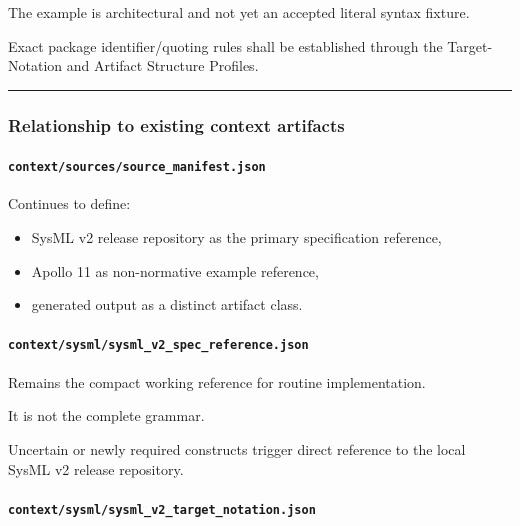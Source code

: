 The example is architectural and not yet an accepted literal syntax fixture.

Exact package identifier/quoting rules shall be established through the Target-Notation and Artifact Structure Profiles.

\begin{center}\rule{0.5\linewidth}{0.5pt}\end{center}

\hypertarget{relationship-to-existing-context-artifacts}{%
\subsubsection{Relationship to existing context artifacts}\label{relationship-to-existing-context-artifacts}}

\hypertarget{contextsourcessource_manifestjson}{%
\paragraph{\texorpdfstring{\texttt{context/sources/source\_manifest.json}}{context/sources/source\_manifest.json}}\label{contextsourcessource_manifestjson}}

Continues to define:

\begin{itemize}
\tightlist
\item
  SysML v2 release repository as the primary specification reference,
\item
  Apollo 11 as non-normative example reference,
\item
  generated output as a distinct artifact class.
\end{itemize}

\hypertarget{contextsysmlsysml_v2_spec_referencejson}{%
\paragraph{\texorpdfstring{\texttt{context/sysml/sysml\_v2\_spec\_reference.json}}{context/sysml/sysml\_v2\_spec\_reference.json}}\label{contextsysmlsysml_v2_spec_referencejson}}

Remains the compact working reference for routine implementation.

It is not the complete grammar.

Uncertain or newly required constructs trigger direct reference to the local SysML v2 release repository.

\hypertarget{contextsysmlsysml_v2_target_notationjson}{%
\paragraph{\texorpdfstring{\texttt{context/sysml/sysml\_v2\_target\_notation.json}}{context/sysml/sysml\_v2\_target\_notation.json}}\label{contextsysmlsysml_v2_target_notationjson}}

